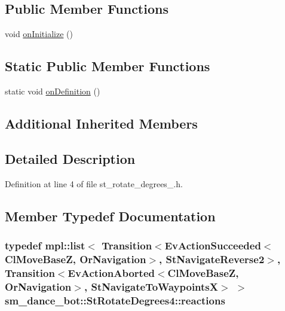 \subsection*{Public Member Functions}
\begin{DoxyCompactItemize}
\item 
void \hyperlink{structsm__dance__bot_1_1StRotateDegrees4_a10d912862ef26c747bc10f7539dc8027}{on\+Initialize} ()
\end{DoxyCompactItemize}
\subsection*{Static Public Member Functions}
\begin{DoxyCompactItemize}
\item 
static void \hyperlink{structsm__dance__bot_1_1StRotateDegrees4_ac0484e835c340cb9d7632ed1fe349b0b}{on\+Definition} ()
\end{DoxyCompactItemize}
\subsection*{Additional Inherited Members}


\subsection{Detailed Description}


Definition at line 4 of file st\+\_\+rotate\+\_\+degrees\+\_.\+h.



\subsection{Member Typedef Documentation}
\subsubsection[{\texorpdfstring{reactions}{reactions}}]{\setlength{\rightskip}{0pt plus 5cm}typedef mpl\+::list$<$ Transition$<$Ev\+Action\+Succeeded$<${\bf Cl\+Move\+BaseZ}, {\bf Or\+Navigation}$>$, {\bf St\+Navigate\+Reverse2}$>$, Transition$<$Ev\+Action\+Aborted$<${\bf Cl\+Move\+BaseZ}, {\bf Or\+Navigation}$>$, {\bf St\+Navigate\+To\+WaypointsX}$>$ $>$ {\bf sm\+\_\+dance\+\_\+bot\+::\+St\+Rotate\+Degrees4\+::reactions}}\hypertarget{structsm__dance__bot_1_1StRotateDegrees4_a4850f13da169b79792836fa0319d0659}{}\label{structsm__dance__bot_1_1StRotateDegrees4_a4850f13da169b79792836fa0319d0659}


